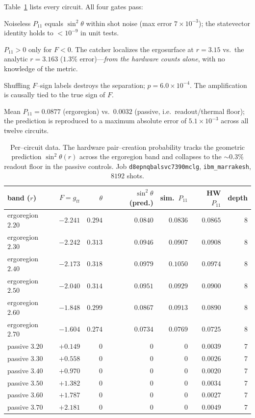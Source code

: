 \documentclass[11pt]{article}
\newcommand{\code}[1]{\texttt{\small #1}}
\begin{document}
Table~\ref{tab:data} lists every circuit. All four gates pass:

\begin{description}[nosep]
\item[\textnormal{(G1) Wiring.}] Noiseless $P_{11}$ equals $\sin^2\theta$ within shot noise
(max error $7\times10^{-3}$); the statevector identity holds to $<10^{-9}$ in unit tests.
\item[\textnormal{(G2) Geometric onset.}] $P_{11}>0$ only for $F<0$. The catcher localizes the
ergosurface at $r=3.15$ vs.\ the analytic $r=3.163$ ($1.3\%$ error)---\emph{from the hardware
counts alone}, with no knowledge of the metric.
\item[\textnormal{(G3) Surrogate.}] Shuffling $F$--sign labels destroys the separation;
$p=6.0\times10^{-4}$. The amplification is causally tied to the true sign of $F$.
\item[\textnormal{(G4) Hardware robustness.}] Mean $P_{11}=0.0877$ (ergoregion) vs.\ $0.0032$
(passive, i.e.\ readout/thermal floor); the prediction is reproduced to a maximum absolute error
of $5.1\times10^{-3}$ across all twelve circuits.
\end{description}

\begin{table}[t]
\centering
\small
\begin{tabular}{lrrrrrr}
\toprule
band ($r$) & $F=g_{tt}$ & $\theta$ & $\sin^2\theta$ (pred.) & sim.\ $P_{11}$ & \textbf{HW $P_{11}$} & depth \\
\midrule
ergoregion $2.20$ & $-2.241$ & $0.294$ & $0.0840$ & $0.0836$ & $0.0865$ & 8 \\
ergoregion $2.30$ & $-2.242$ & $0.313$ & $0.0946$ & $0.0907$ & $0.0908$ & 8 \\
ergoregion $2.40$ & $-2.173$ & $0.318$ & $0.0979$ & $0.1050$ & $0.0974$ & 8 \\
ergoregion $2.50$ & $-2.040$ & $0.314$ & $0.0951$ & $0.0929$ & $0.0900$ & 8 \\
ergoregion $2.60$ & $-1.848$ & $0.299$ & $0.0867$ & $0.0913$ & $0.0890$ & 8 \\
ergoregion $2.70$ & $-1.604$ & $0.274$ & $0.0734$ & $0.0769$ & $0.0725$ & 8 \\
\midrule
passive $3.20$ & $+0.149$ & $0$ & $0$ & $0$ & $0.0039$ & 7 \\
passive $3.30$ & $+0.558$ & $0$ & $0$ & $0$ & $0.0026$ & 7 \\
passive $3.40$ & $+0.970$ & $0$ & $0$ & $0$ & $0.0020$ & 7 \\
passive $3.50$ & $+1.382$ & $0$ & $0$ & $0$ & $0.0034$ & 7 \\
passive $3.60$ & $+1.787$ & $0$ & $0$ & $0$ & $0.0027$ & 7 \\
passive $3.70$ & $+2.181$ & $0$ & $0$ & $0$ & $0.0049$ & 7 \\
\bottomrule
\end{tabular}
\caption{Per--circuit data. The hardware pair--creation probability tracks the geometric
prediction $\sin^2\theta(r)$ across the ergoregion band and collapses to the $\sim0.3\%$ readout
floor in the passive controls. Job \code{d8epnqbalsvc7390mclg}, \code{ibm\_marrakesh}, $8192$
shots.}
\label{tab:data}
\end{table}
\end{document}

